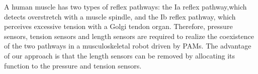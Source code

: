 A human muscle has two types of reflex pathways: the Ia reflex pathway,which detects overstretch with a muscle spindle, and the Ib reflex pathway, which perceives excessive tension with a Golgi tendon organ. Therefore, pressure sensors, tension sensors and length sensors are required to realize the coexistence of the two pathways in a musculoskeletal robot driven by PAMs. The advantage of our approach is that the length sensors can be removed by allocating its function to the pressure and tension sensors.

\balance